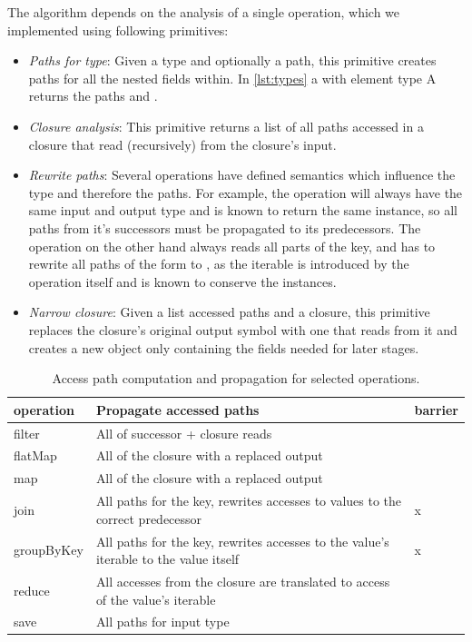 The algorithm depends on the analysis of a single operation, which we implemented using following primitives:
\begin{itemize}
\item \emph{Paths for type}: Given a type and optionally a path, this primitive creates paths for all the nested fields within. In \ref{lst:types} a  with element type A returns the paths  and . 
\item \emph{Closure analysis}: This primitive returns a list of all paths accessed in a closure that read (recursively) from the closure's input.
\item \emph{Rewrite paths}: Several operations have defined semantics which influence the type and therefore the paths. For example, the  operation will always have the same input and output type and is known to return the same instance, so all paths from it's successors must be propagated to its predecessors. The  operation on the other hand always reads all parts of the key, and has to rewrite all paths of the form  to , as the iterable is introduced by the operation itself and is known to conserve the instances.
\item \emph{Narrow closure}: Given a list accessed paths and a closure, this primitive replaces the closure's original output symbol with one that reads from it and creates a new object only containing the fields needed for later stages.
\end{itemize}

\begin{table}[width=0.5\pagewidth, float=t]

    \begin{tabularx}{0.5\textwidth}{l|X|l}
        operation    & Propagate accessed paths 							     & barrier \\ \hline
        filter       & All of successor + closure reads                                                      & ~       \\ 
        flatMap      & All of the closure with a replaced output                                             & ~       \\ 
        map          & All of the closure with a replaced output                                             & ~       \\ 
        join         & All paths for the key, rewrites accesses to values to the correct predecessor         & x       \\ 
        groupByKey   & All paths for the key, rewrites accesses to the value's iterable to the value itself  & x       \\ 
        reduce       & All accesses from the closure are translated to access of the value's iterable        & ~       \\ 
        save         & All paths for input type           	                                             & ~       \\ 
    \end{tabularx}
    
    \caption{Access path computation and propagation for selected operations.}
\label{table:field_reduction}
 \end{table}

